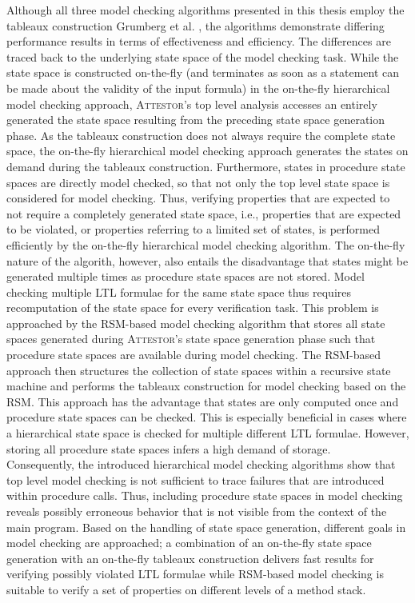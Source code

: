 \documentclass[a4paper, 12pt, twoside]{report}
\begin{document}
	Although all three model checking algorithms presented in this thesis employ the tableaux construction Grumberg et al. \cite{bhat1995efficient}, the algorithms demonstrate differing performance results in terms of effectiveness and efficiency. The differences are traced back to the underlying state space of the model checking task. While the state space is constructed on-the-fly (and terminates as soon as a statement can be made about the validity of the input formula) in the on-the-fly hierarchical model checking approach, \textsc{Attestor}'s top level analysis accesses an entirely generated the state space resulting from the preceding state space generation phase. As the tableaux construction does not always require the complete state space, the on-the-fly hierarchical model checking approach generates the states on demand during the tableaux construction. Furthermore, states in procedure state spaces are directly model checked, so that not only the top level state space is considered for model checking. Thus, verifying properties that are expected to not require a completely generated state space, i.e., properties that are expected to be violated, or properties referring to a limited set of states, is performed efficiently by the on-the-fly hierarchical model checking algorithm. The on-the-fly nature of the algorith, however, also entails the disadvantage that states might be generated multiple times as procedure state spaces are not stored. Model checking multiple LTL formulae for the same state space thus requires recomputation of the state space for every verification task. This problem is approached by the RSM-based model checking algorithm that stores all state spaces generated during \textsc{Attestor}'s state space generation phase such that procedure state spaces are available during model checking. The RSM-based approach then structures the collection of state spaces within a recursive state machine and performs the tableaux construction for model checking based on the RSM. This approach has the advantage that states are only computed once and procedure state spaces can be checked. This is especially beneficial in cases where a hierarchical state space is checked for multiple different LTL formulae. However, storing all procedure state spaces infers a high demand of storage.\\
	
	Consequently, the introduced hierarchical model checking algorithms show that top level model checking is not sufficient to trace failures that are introduced within procedure calls. Thus, including procedure state spaces in model checking reveals possibly erroneous behavior that is not visible from the context of the main program. Based on the handling of state space generation, different goals in model checking are approached; a combination of an on-the-fly state space generation with an on-the-fly tableaux construction delivers fast results for verifying possibly violated LTL formulae while RSM-based model checking is suitable to verify a set of properties on different levels of a method stack.\\
		
\end{document}
